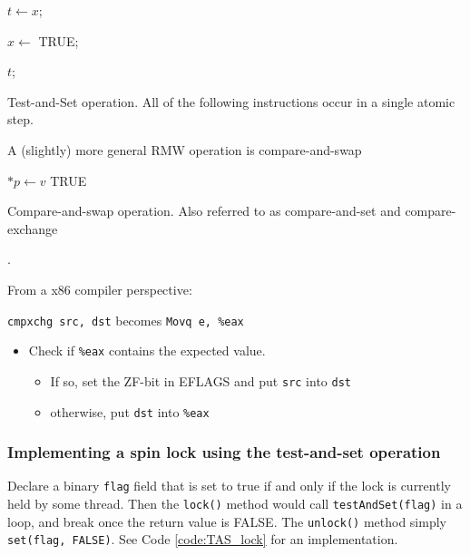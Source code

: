 \begin{algorithm}[H]
    \BlankLine
    $t \leftarrow x$;
    
    $x \leftarrow $ TRUE;
    
    \Return $t$;
    \caption{Test-and-Set operation. All of the following instructions occur in a single atomic step.}
    \label{alg:testAndSet}
\end{algorithm}

A (slightly) more general RMW operation is compare-and-swap

\begin{algorithm}[H]
    \BlankLine
     {
        $*p \leftarrow v$\;
        \Return TRUE\;
    } 
    \caption{Compare-and-swap operation. Also referred to as compare-and-set and compare-exchange}.
    \label{alg:testAndSet}
\end{algorithm}

From a x86 compiler perspective:

\verb|cmpxchg src, dst|
becomes
\verb|Movq e, %eax|
\begin{itemize}
    \item Check if \verb|%eax| contains the expected value.
    \begin{itemize}
        \item If so, set the ZF-bit in EFLAGS and put \verb|src| into \verb|dst|
        \item otherwise, put \verb|dst| into \verb|%eax|
    \end{itemize}
\end{itemize}

\subsubsection{Implementing a spin lock using the test-and-set operation}
Declare a binary \verb|flag| field that is set to true if and only if the lock is currently held by some thread. Then the \verb|lock()| method would call \verb|testAndSet(flag)| in a loop, and break once the return value is FALSE. The \verb|unlock()| method simply \verb|set(flag, FALSE)|. See Code \ref{code:TAS_lock} for an implementation.

